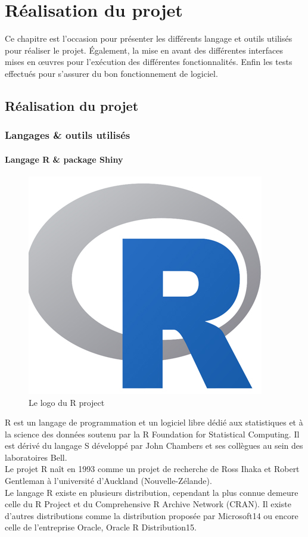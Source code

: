 \chapter{Réalisation du projet}
Ce chapitre est l’occasion pour présenter les différents langage et outils utilisés pour réaliser le projet. Également, la mise en avant des différentes interfaces mises en œuvres pour l’exécution des différentes fonctionnalités. Enfin les tests effectués pour s’assurer du bon fonctionnement de logiciel.

\newpage


\section {Réalisation du projet }
\subsection {Langages \& outils utilisés}
\subsubsection {Langage R \& package Shiny}

\begin{figure}[!h]
	\center
	\includegraphics[scale=0.2]{img/R_logo.png}
	\caption {Le logo du R project}
\end{figure}
R est un langage de programmation et un logiciel libre dédié aux statistiques et à la science des données soutenu par la R Foundation for Statistical Computing. Il est dérivé du langage S développé par John Chambers et ses collègues au sein des laboratoires Bell.\\
Le projet R naît en 1993 comme un projet de recherche de Ross Ihaka et Robert Gentleman à l'université d'Auckland (Nouvelle-Zélande). \\
Le langage R existe en plusieurs distribution, cependant la plus connue demeure celle du R Project et du Comprehensive R Archive Network (CRAN). Il existe d'autres distributions comme la distribution proposée par Microsoft14 ou encore celle de l'entreprise Oracle, Oracle R Distribution15.\\

